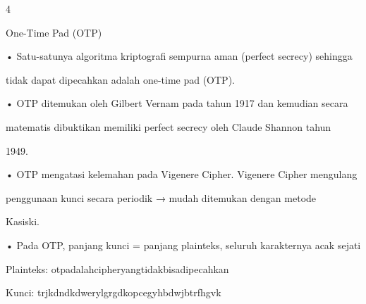 \documentclass{article}
\begin{document}

4

One-Time Pad (OTP)

• Satu-satunya algoritma kriptografi sempurna aman (perfect secrecy) sehingga 

tidak dapat dipecahkan adalah one-time pad (OTP).

• OTP ditemukan oleh Gilbert Vernam pada tahun 1917 dan kemudian secara 

matematis dibuktikan memiliki perfect secrecy oleh Claude Shannon tahun 

1949.

• OTP mengatasi kelemahan pada Vigenere Cipher. Vigenere Cipher mengulang 

penggunaan kunci secara periodik → mudah ditemukan dengan metode 

Kasiski.

• Pada OTP, panjang kunci = panjang plainteks, seluruh karakternya acak sejati

Plainteks: otpadalahcipheryangtidakbisadipecahkan

Kunci:       trjkdndkdwerylgrgdkopcegyhbdwjbtrfhgvk
\end{document}
